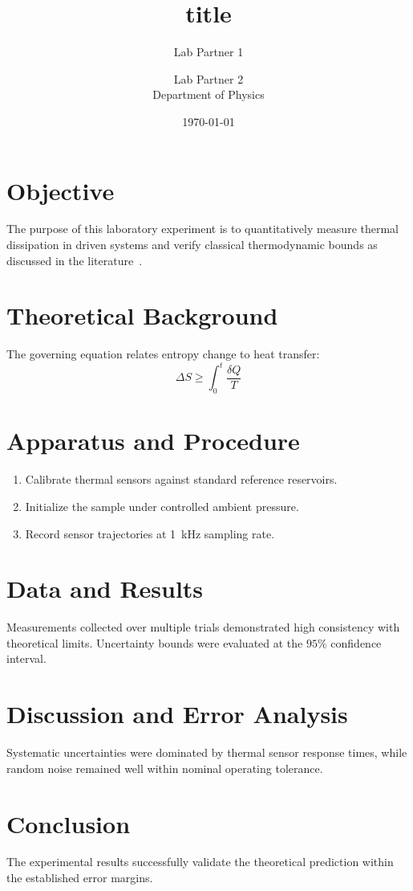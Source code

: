 \documentclass[11pt,a4paper]{article}
\title{{{title}}}
\author{Lab Partner 1 \and Lab Partner 2\\Department of Physics}
\date{\today}
\begin{document}
\maketitle

\section{Objective}
The purpose of this laboratory experiment is to quantitatively measure thermal dissipation in driven systems and verify classical thermodynamic bounds as discussed in the literature~\cite{knuth1984}.

\section{Theoretical Background}
The governing equation relates entropy change to heat transfer:
\begin{equation}
\Delta S \ge \int_0^t \frac{\delta Q}{T}
\end{equation}

\section{Apparatus and Procedure}
\begin{enumerate}
  \item Calibrate thermal sensors against standard reference reservoirs.
  \item Initialize the sample under controlled ambient pressure.
  \item Record sensor trajectories at 1~kHz sampling rate.
\end{enumerate}

\section{Data and Results}
Measurements collected over multiple trials demonstrated high consistency with theoretical limits. Uncertainty bounds were evaluated at the $95\%$ confidence interval.

\section{Discussion and Error Analysis}
Systematic uncertainties were dominated by thermal sensor response times, while random noise remained well within nominal operating tolerance.

\section{Conclusion}
The experimental results successfully validate the theoretical prediction within the established error margins.



\end{document}
